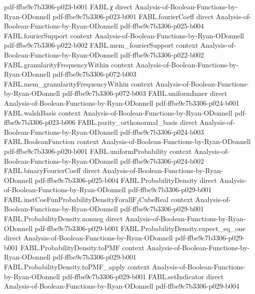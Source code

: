 \begin{theorem}
{    pdf-ffbe9c7b3306-p023-b001}
\proofstep
  {FABL.χ}
  {direct}
  {Analysis-of-Boolean-Functions-by-Ryan-ODonnell}
  {pdf-ffbe9c7b3306-p023-b001}
\proofstep
  {FABL.fourierCoeff}
  {direct}
  {Analysis-of-Boolean-Functions-by-Ryan-ODonnell}
  {pdf-ffbe9c7b3306-p025-b004}
\proofstep
  {FABL.fourierSupport}
  {context}
  {Analysis-of-Boolean-Functions-by-Ryan-ODonnell}
  {pdf-ffbe9c7b3306-p022-b002}
\proofstep
  {FABL.mem_fourierSupport}
  {context}
  {Analysis-of-Boolean-Functions-by-Ryan-ODonnell}
  {pdf-ffbe9c7b3306-p022-b002}
\proofstep
  {FABL.granularityFrequencyWithin}
  {context}
  {Analysis-of-Boolean-Functions-by-Ryan-ODonnell}
  {pdf-ffbe9c7b3306-p072-b003}
\proofstep
  {FABL.mem_granularityFrequencyWithin}
  {context}
  {Analysis-of-Boolean-Functions-by-Ryan-ODonnell}
  {pdf-ffbe9c7b3306-p072-b003}
\proofstep
  {FABL.uniformInner}
  {direct}
  {Analysis-of-Boolean-Functions-by-Ryan-ODonnell}
  {pdf-ffbe9c7b3306-p024-b001}
\proofstep
  {FABL.walshBasis}
  {context}
  {Analysis-of-Boolean-Functions-by-Ryan-ODonnell}
  {pdf-ffbe9c7b3306-p023-b006}
\proofstep
  {FABL.parity_orthonormal_basis}
  {direct}
  {Analysis-of-Boolean-Functions-by-Ryan-ODonnell}
  {pdf-ffbe9c7b3306-p024-b003}
\proofstep
  {FABL.BooleanFunction}
  {context}
  {Analysis-of-Boolean-Functions-by-Ryan-ODonnell}
  {pdf-ffbe9c7b3306-p020-b001}
\proofstep
  {FABL.uniformProbability}
  {context}
  {Analysis-of-Boolean-Functions-by-Ryan-ODonnell}
  {pdf-ffbe9c7b3306-p024-b002}
\proofstep
  {FABL.binaryFourierCoeff}
  {direct}
  {Analysis-of-Boolean-Functions-by-Ryan-ODonnell}
  {pdf-ffbe9c7b3306-p025-b004}
\proofstep
  {FABL.ProbabilityDensity}
  {direct}
  {Analysis-of-Boolean-Functions-by-Ryan-ODonnell}
  {pdf-ffbe9c7b3306-p029-b001}
\proofstep
  {FABL.instCoeFunProbabilityDensityForallF₂CubeReal}
  {context}
  {Analysis-of-Boolean-Functions-by-Ryan-ODonnell}
  {pdf-ffbe9c7b3306-p029-b001}
\proofstep
  {FABL.ProbabilityDensity.nonneg}
  {direct}
  {Analysis-of-Boolean-Functions-by-Ryan-ODonnell}
  {pdf-ffbe9c7b3306-p029-b001}
\proofstep
  {FABL.ProbabilityDensity.expect_eq_one}
  {direct}
  {Analysis-of-Boolean-Functions-by-Ryan-ODonnell}
  {pdf-ffbe9c7b3306-p029-b001}
\proofstep
  {FABL.ProbabilityDensity.toPMF}
  {context}
  {Analysis-of-Boolean-Functions-by-Ryan-ODonnell}
  {pdf-ffbe9c7b3306-p029-b001}
\proofstep
  {FABL.ProbabilityDensity.toPMF_apply}
  {context}
  {Analysis-of-Boolean-Functions-by-Ryan-ODonnell}
  {pdf-ffbe9c7b3306-p029-b001}
\proofstep
  {FABL.setIndicator}
  {direct}
  {Analysis-of-Boolean-Functions-by-Ryan-ODonnell}
  {pdf-ffbe9c7b3306-p029-b004}
\proofstep

\end{theorem}
